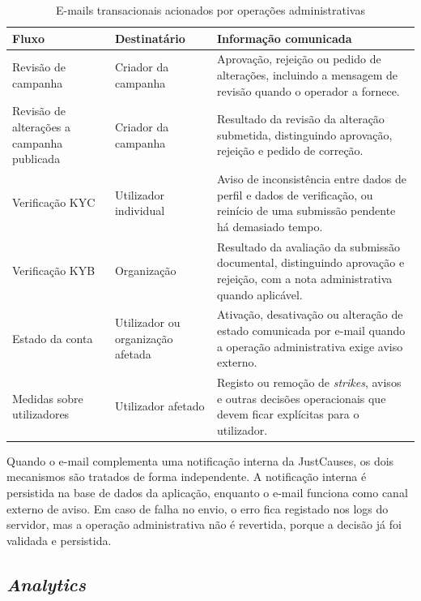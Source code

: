 \begin{table}[H]
\caption{E-mails transacionais acionados por operações administrativas}
\label{tab:emails_transacionais}
\begin{center}
\footnotesize
\begin{tabular}{|p{3.5cm}|p{3.4cm}|p{6.2cm}|}
\hline
\textbf{Fluxo} & \textbf{Destinatário} & \textbf{Informação comunicada} \\ \hline
Revisão de campanha & Criador da campanha & Aprovação, rejeição ou pedido de alterações, incluindo a mensagem de revisão quando o operador a fornece. \\ \hline
Revisão de alterações a campanha publicada & Criador da campanha & Resultado da revisão da alteração submetida, distinguindo aprovação, rejeição e pedido de correção. \\ \hline
Verificação KYC & Utilizador individual & Aviso de inconsistência entre dados de perfil e dados de verificação, ou reinício de uma submissão pendente há demasiado tempo. \\ \hline
Verificação KYB & Organização & Resultado da avaliação da submissão documental, distinguindo aprovação e rejeição, com a nota administrativa quando aplicável. \\ \hline
Estado da conta & Utilizador ou organização afetada & Ativação, desativação ou alteração de estado comunicada por e-mail quando a operação administrativa exige aviso externo. \\ \hline
Medidas sobre utilizadores & Utilizador afetado & Registo ou remoção de \textit{strikes}, avisos e outras decisões operacionais que devem ficar explícitas para o utilizador. \\ \hline
\end{tabular}
\end{center}
\end{table}

Quando o e-mail complementa uma notificação interna da JustCauses, os dois mecanismos são tratados de forma independente. A notificação interna é persistida na base de dados da aplicação, enquanto o e-mail funciona como canal externo de aviso. Em caso de falha no envio, o erro fica registado nos logs do servidor, mas a operação administrativa não é revertida, porque a decisão já foi validada e persistida.

\subsection{\textit{Analytics}}
\label{subsec:impl_analytics}

